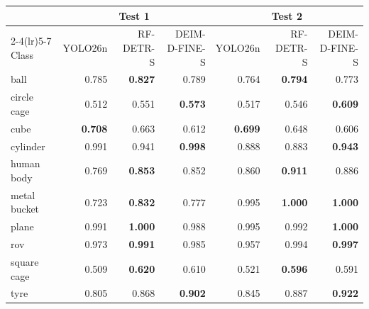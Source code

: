 \begin{tabular}{lrrrrrr}
\toprule
 & \multicolumn{3}{c}{Test 1} & \multicolumn{3}{c}{Test 2} \\
\cmidrule(lr){2-4}\cmidrule(lr){5-7}
Class & YOLO26n & RF-DETR-S & DEIM-D-FINE-S & YOLO26n & RF-DETR-S & DEIM-D-FINE-S \\
\midrule
ball & 0.785 & \textbf{0.827} & 0.789 & 0.764 & \textbf{0.794} & 0.773 \\
circle cage & 0.512 & 0.551 & \textbf{0.573} & 0.517 & 0.546 & \textbf{0.609} \\
cube & \textbf{0.708} & 0.663 & 0.612 & \textbf{0.699} & 0.648 & 0.606 \\
cylinder & 0.991 & 0.941 & \textbf{0.998} & 0.888 & 0.883 & \textbf{0.943} \\
human body & 0.769 & \textbf{0.853} & 0.852 & 0.860 & \textbf{0.911} & 0.886 \\
metal bucket & 0.723 & \textbf{0.832} & 0.777 & 0.995 & \textbf{1.000} & \textbf{1.000} \\
plane & 0.991 & \textbf{1.000} & 0.988 & 0.995 & 0.992 & \textbf{1.000} \\
rov & 0.973 & \textbf{0.991} & 0.985 & 0.957 & 0.994 & \textbf{0.997} \\
square cage & 0.509 & \textbf{0.620} & 0.610 & 0.521 & \textbf{0.596} & 0.591 \\
tyre & 0.805 & 0.868 & \textbf{0.902} & 0.845 & 0.887 & \textbf{0.922} \\
\bottomrule
\end{tabular}
